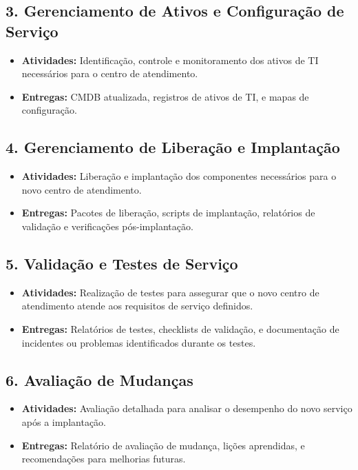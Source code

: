 \documentclass[a4paper,12pt]{article}
\begin{document}
\subsection*{3. Gerenciamento de Ativos e Configuração de Serviço}
\begin{itemize}
    \item \textbf{Atividades:} Identificação, controle e monitoramento dos ativos de TI necessários para o centro de atendimento.
    \item \textbf{Entregas:} CMDB atualizada, registros de ativos de TI, e mapas de configuração.
\end{itemize}

\subsection*{4. Gerenciamento de Liberação e Implantação}
\begin{itemize}
    \item \textbf{Atividades:} Liberação e implantação dos componentes necessários para o novo centro de atendimento.
    \item \textbf{Entregas:} Pacotes de liberação, scripts de implantação, relatórios de validação e verificações pós-implantação.
\end{itemize}

\subsection*{5. Validação e Testes de Serviço}
\begin{itemize}
    \item \textbf{Atividades:} Realização de testes para assegurar que o novo centro de atendimento atende aos requisitos de serviço definidos.
    \item \textbf{Entregas:} Relatórios de testes, checklists de validação, e documentação de incidentes ou problemas identificados durante os testes.
\end{itemize}

\subsection*{6. Avaliação de Mudanças}
\begin{itemize}
    \item \textbf{Atividades:} Avaliação detalhada para analisar o desempenho do novo serviço após a implantação.
    \item \textbf{Entregas:} Relatório de avaliação de mudança, lições aprendidas, e recomendações para melhorias futuras.
\end{itemize}
\end{document}
